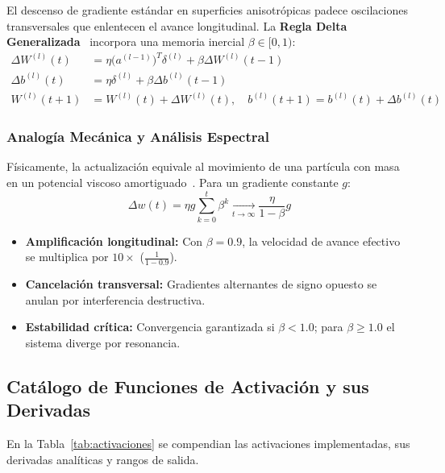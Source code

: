 \documentclass{article}
\begin{document}
El descenso de gradiente estándar en superficies anisotrópicas padece oscilaciones transversales que enlentecen el avance longitudinal. La \textbf{Regla Delta Generalizada}~\cite{rumelhart1986} incorpora una memoria inercial $\beta \in [0, 1)$:
\begin{align}
    \Delta W^{(l)}(t) &= \eta \big(a^{(l-1)}\big)^T \delta^{(l)} + \beta \Delta W^{(l)}(t-1) \label{eq:momento_W} \\
    \Delta b^{(l)}(t) &= \eta \delta^{(l)} + \beta \Delta b^{(l)}(t-1) \label{eq:momento_b} \\
    W^{(l)}(t+1) &= W^{(l)}(t) + \Delta W^{(l)}(t), \quad b^{(l)}(t+1) = b^{(l)}(t) + \Delta b^{(l)}(t)
\end{align}

\subsubsection{Analogía Mecánica y Análisis Espectral}
Físicamente, la actualización equivale al movimiento de una partícula con masa en un potencial viscoso amortiguado~\cite{qian1999}. Para un gradiente constante $g$:
\begin{equation}
    \Delta w(t) = \eta g \sum_{k=0}^{t} \beta^k \xrightarrow[t \to \infty]{} \frac{\eta}{1 - \beta} g
\end{equation}
\begin{itemize}
    \item \textbf{Amplificación longitudinal:} Con $\beta = 0.9$, la velocidad de avance efectivo se multiplica por $10\times$ ($\frac{1}{1-0.9}$).
    \item \textbf{Cancelación transversal:} Gradientes alternantes de signo opuesto se anulan por interferencia destructiva.
    \item \textbf{Estabilidad crítica:} Convergencia garantizada si $\beta < 1.0$; para $\beta \ge 1.0$ el sistema diverge por resonancia.
\end{itemize}

\subsection{Catálogo de Funciones de Activación y sus Derivadas}

En la Tabla~\ref{tab:activaciones} se compendian las activaciones implementadas, sus derivadas analíticas y rangos de salida.
\end{document}
